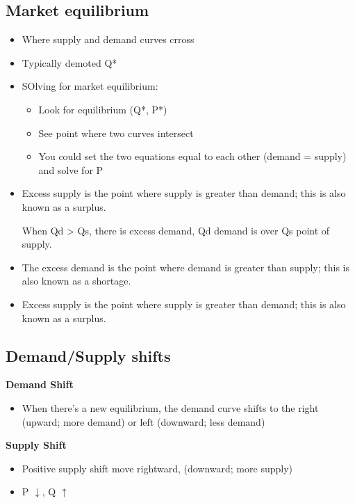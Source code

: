 \documentclass{article}
\begin{document}
\subsection{Market equilibrium}
\begin{itemize}
  \item Where supply and demand curves crross
  \item Typically demoted Q*
  \item SOlving for market equilibrium:
    \begin{itemize}
      \item Look for equilibrium (Q*, P*)
      \item See point where two curves intersect
      \item You could set the two equations equal to each other
        (demand = supply) and solve for P
    \end{itemize}
  \item Excess supply is the point where supply is greater
    than demand; this is also known as a surplus.

    When Qd > Qs, there is excess demand,
    Qd demand is over Qs point of supply.
  \item The excess demand is the point where demand is greater
    than supply; this is also known as a shortage.
  \item Excess supply is the point where supply is greater
    than demand; this is also known as a surplus.
\end{itemize}

\subsection{Demand/Supply shifts}
\textbf{Demand Shift}
\begin{itemize}
  \item When there's a new equilibrium, the demand curve shifts
    to the right (upward; more demand) or left (downward; less demand)
\end{itemize}

\textbf{Supply Shift}
\begin{itemize}
  \item Positive supply shift move rightward, (downward; more supply)
  \item P $\downarrow{}$, Q $\uparrow{}$
\end{itemize}
\end{document}
